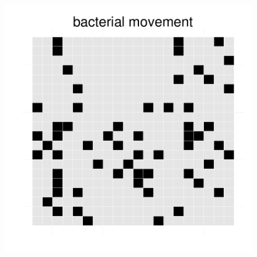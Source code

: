 \begin{figure}[h!]
{\begin{minipage}[t]{0.3\textwidth}
  \end{minipage}
  \begin{minipage}[t]{0.3\textwidth}
    \includegraphics[width=\textwidth]{../results/barkeri_beijerinckii_20x20_seed6764_bac150.pdf}
  \end{minipage}
  }
\end{figure}
